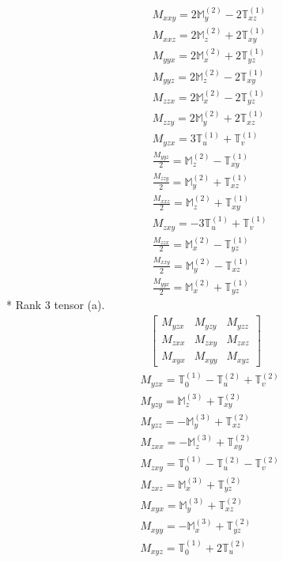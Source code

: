 \documentclass[fleqn,8pt,landscape]{jsarticle}
\begin{document}
\begin{align*}
& M_{xxy} = 2 \mathbb{M}_{y}^{(2)} - 2 \mathbb{T}_{xz}^{(1)} \\
& M_{xxz} = 2 \mathbb{M}_{z}^{(2)} + 2 \mathbb{T}_{xy}^{(1)} \\
& M_{yyx} = 2 \mathbb{M}_{x}^{(2)} + 2 \mathbb{T}_{yz}^{(1)} \\
& M_{yyz} = 2 \mathbb{M}_{z}^{(2)} - 2 \mathbb{T}_{xy}^{(1)} \\
& M_{zzx} = 2 \mathbb{M}_{x}^{(2)} - 2 \mathbb{T}_{yz}^{(1)} \\
& M_{zzy} = 2 \mathbb{M}_{y}^{(2)} + 2 \mathbb{T}_{xz}^{(1)} \\
& M_{yzx} = 3 \mathbb{T}_{u}^{(1)} + \mathbb{T}_{v}^{(1)} \\
& \frac{M_{yyz}}{2} = \mathbb{M}_{z}^{(2)} - \mathbb{T}_{xy}^{(1)} \\
& \frac{M_{zzy}}{2} = \mathbb{M}_{y}^{(2)} + \mathbb{T}_{xz}^{(1)} \\
& \frac{M_{xxz}}{2} = \mathbb{M}_{z}^{(2)} + \mathbb{T}_{xy}^{(1)} \\
& M_{zxy} = - 3 \mathbb{T}_{u}^{(1)} + \mathbb{T}_{v}^{(1)} \\
& \frac{M_{zzx}}{2} = \mathbb{M}_{x}^{(2)} - \mathbb{T}_{yz}^{(1)} \\
& \frac{M_{xxy}}{2} = \mathbb{M}_{y}^{(2)} - \mathbb{T}_{xz}^{(1)} \\
& \frac{M_{yyx}}{2} = \mathbb{M}_{x}^{(2)} + \mathbb{T}_{yz}^{(1)}
\end{align*}
* Rank 3 tensor (a).
\begin{align*}
\begin{bmatrix} M_{yzx} & M_{yzy} & M_{yzz} \\ M_{zxx} & M_{zxy} & M_{zxz} \\ M_{xyx} & M_{xyy} & M_{xyz} \end{bmatrix}
\end{align*}
\begin{align*}
& M_{yzx} = \mathbb{T}_{0}^{(1)} - \mathbb{T}_{u}^{(2)} + \mathbb{T}_{v}^{(2)} \\
& M_{yzy} = \mathbb{M}_{z}^{(3)} + \mathbb{T}_{xy}^{(2)} \\
& M_{yzz} = - \mathbb{M}_{y}^{(3)} + \mathbb{T}_{xz}^{(2)} \\
& M_{zxx} = - \mathbb{M}_{z}^{(3)} + \mathbb{T}_{xy}^{(2)} \\
& M_{zxy} = \mathbb{T}_{0}^{(1)} - \mathbb{T}_{u}^{(2)} - \mathbb{T}_{v}^{(2)} \\
& M_{zxz} = \mathbb{M}_{x}^{(3)} + \mathbb{T}_{yz}^{(2)} \\
& M_{xyx} = \mathbb{M}_{y}^{(3)} + \mathbb{T}_{xz}^{(2)} \\
& M_{xyy} = - \mathbb{M}_{x}^{(3)} + \mathbb{T}_{yz}^{(2)} \\
& M_{xyz} = \mathbb{T}_{0}^{(1)} + 2 \mathbb{T}_{u}^{(2)}
\end{align*}
\end{document}
